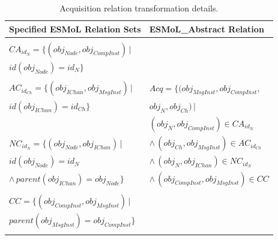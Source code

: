 \begin{table}
\centering

\begin{tabular}[width=0.5\columnwidth]{ | l | l | }
 \hline
 \textbf{Specified ESMoL Relation Sets} & \textbf{ESMoL\_Abstract Relation} \\
 \hline \hline
                                                                        & \\
 $CA_{id_N} = \{ (obj_{Node}, obj_{CompInst} ) \, |$                    & \\
 \hspace{1.7cm} $ id(obj_{Node}) = id_N \} $                            & \\
                                                                        & \\
 $AC_{id_{Ch}} = \{ (obj_{IChan}, obj_{MsgInst} ) \, |$                 & 
$ Acq = \{(obj_{MsgInst}, obj_{CompInst}, $  \\
 \hspace{1.6cm} $id(obj_{IChan}) = id_{Ch} \} $                         & 
\hspace{1.3cm} $obj_{N}, obj_{Ch}) \, |$ \\
                                                                        &  
\hspace{0.8cm} $(obj_{N}, obj_{CompInst}) \in CA_{id_N}$ \\
 $NC_{id_N} = \{ (obj_{Node}, obj_{IChan}) \, | $                       & 
\hspace{0.5cm} $ \wedge \, (obj_{Ch}, obj_{MsgInst}) \in AC_{id_{Ch}}$ \\
 \hspace{1.35cm} $id(obj_{Node}) = id_N $                                &
\hspace{0.5cm} $ \wedge \, (obj_{N}, obj_{IChan}) \in NC_{id_N}$ \\ 
 \hspace{1cm} $ \wedge \, parent(obj_{IChan} ) = obj_{Node} \}$       &
\hspace{0.5cm} $ \wedge \, (obj_{CompInst}, obj_{MsgInst}) \in CC $ \\
                                                                        & \\
 $CC = \{ (obj_{CompInst}, obj_{MsgInst} ) \, | $                       & \\
 \hspace{0.7cm} $parent(obj_{MsgInst} ) = obj_{CompInst} \}$            & \\ 
                                                                        & \\
 \hline
\end{tabular}
	\caption{Acquisition relation transformation details.}
	\label{tab:acquisition}
\end{table}

